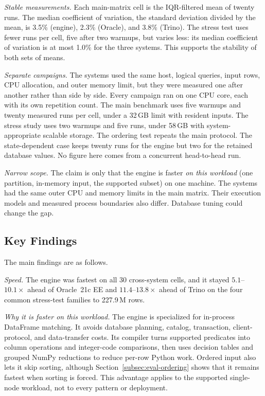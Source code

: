 \emph{Stable measurements.}  Each main-matrix cell is the IQR-filtered
mean of twenty runs.  The median coefficient of variation, the
standard deviation divided by the mean, is 3.5\% (engine), 2.3\%
(Oracle), and 3.8\% (Trino).  The stress test uses fewer runs per cell,
five after two warmups, but varies less: its median coefficient of
variation is at most 1.0\% for the three systems.  This supports the
stability of both sets of means.

\emph{Separate campaigns.}  The systems used the same host, logical
queries, input rows, CPU allocation, and outer memory limit, but they
were measured one after another rather than side by side.  Every
campaign ran on one CPU core, each with its own repetition count.  The
main benchmark uses five warmups and twenty measured runs per cell,
under a 32\,GB limit with resident inputs.  The stress study uses two
warmups and five runs, under 58\,GB with system-appropriate scalable
storage.  The ordering test repeats the main protocol.  The
state-dependent case keeps twenty runs for the engine but two for the
retained database values.  No figure here comes from a concurrent
head-to-head run.

\emph{Narrow scope.}  The claim is only that the engine is faster
\emph{on this workload} (one partition, in-memory input, the supported
subset) on one machine.  The systems had the same outer CPU and
memory limits in the main matrix.  Their execution models and measured process
boundaries also differ.  Database tuning could change the gap.

\subsection{Key Findings}
\label{subsec:eval-findings}

The main findings are as follows.

\emph{Speed.}  The engine was fastest on all 30 cross-system cells, and
it stayed $5.1$--$10.1\times$ ahead of Oracle~21c EE and
$11.4$--$13.8\times$ ahead of Trino on the four common stress-test
families to 227.9\,M rows.

\emph{Why it is faster on this workload.}  The engine is specialized
for in-process DataFrame matching.  It avoids database planning,
catalog, transaction, client-protocol, and data-transfer costs.  Its
compiler turns supported predicates into column operations and
integer-code comparisons, then uses decision tables and grouped NumPy
reductions to reduce per-row Python work.  Ordered input also lets it
skip sorting, although Section~\ref{subsec:eval-ordering} shows that
it remains fastest when sorting is forced.  This advantage applies to
the supported single-node workload, not to every pattern or deployment.

